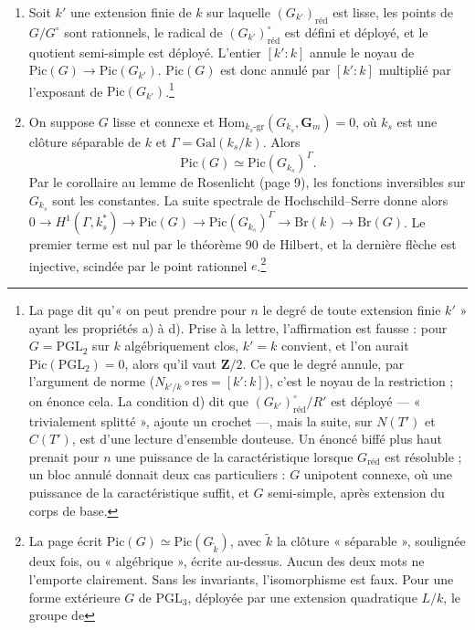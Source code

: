 \documentclass[11pt,a4paper]{article}
\begin{document}
\begin{enumerate}
\item[1°)] Soit $k'$ une extension finie de $k$ sur laquelle
$(G_{k'})_{\mathrm{réd}}$ est lisse, les points de $G/G^{\circ}$ sont
rationnels, le radical de $(G_{k'})^{\circ}_{\mathrm{réd}}$ est défini et
déployé, et le quotient semi-simple est déployé. L'entier $[k':k]$ annule le
noyau de $\mathrm{Pic}(G) \to \mathrm{Pic}(G_{k'})$. $\mathrm{Pic}(G)$ est
donc annulé par $[k':k]$ multiplié par l'exposant de
$\mathrm{Pic}(G_{k'})$.\footnote{La page dit qu'« on peut prendre pour $n$ le
degré de toute extension finie $k'$ » ayant les propriétés a) à d). Prise à la
lettre, l'affirmation est fausse : pour $G = \mathrm{PGL}_{2}$ sur $k$
algébriquement clos, $k' = k$ convient, et l'on aurait
$\mathrm{Pic}(\mathrm{PGL}_{2}) = 0$, alors qu'il vaut $\mathbf{Z}/2$. Ce
que le degré annule, par l'argument de norme
($N_{k'/k} \circ \mathrm{res} = [k':k]$), c'est le noyau de la restriction ;
on énonce cela. La condition d) dit que
$(G_{k'})^{\circ}_{\mathrm{réd}}/R'$ est déployé --- « trivialement
splitté », ajoute un crochet ---, mais la suite, sur $N(T')$ et $C(T')$, est
d'une lecture d'ensemble douteuse. Un énoncé biffé plus haut prenait pour $n$
une puissance de la caractéristique lorsque $G_{\mathrm{réd}}$ est
résoluble ; un bloc annulé donnait deux cas particuliers : $G$ unipotent
connexe, où une puissance de la caractéristique suffit, et $G$ semi-simple,
après extension du corps de base.}
\item[2°)] On suppose $G$ lisse et connexe et
$\mathrm{Hom}_{k_{s}\text{-gr}}(G_{k_{s}}, \mathbf{G}_{m}) = 0$, où $k_{s}$ est
une clôture séparable de $k$ et $\Gamma = \mathrm{Gal}(k_{s}/k)$. Alors
\[
  \mathrm{Pic}(G) \simeq \mathrm{Pic}(G_{k_{s}})^{\Gamma} .
\]
Par le corollaire au lemme de Rosenlicht (page 9), les fonctions
inversibles sur $G_{k_{s}}$ sont les constantes. La suite spectrale de
Hochschild--Serre donne alors
$0 \to H^{1}(\Gamma, k_{s}^{*}) \to \mathrm{Pic}(G) \to
\mathrm{Pic}(G_{k_{s}})^{\Gamma} \to \mathrm{Br}(k) \to \mathrm{Br}(G)$. Le
premier terme est nul par le théorème 90 de Hilbert, et la dernière flèche
est injective, scindée par le point rationnel $e$.\footnote{La page écrit
$\mathrm{Pic}(G) \simeq \mathrm{Pic}(G_{\tilde k})$, avec $\tilde k$ la
clôture « séparable », soulignée deux fois, ou « algébrique », écrite
au-dessus. Aucun des deux mots ne l'emporte clairement. Sans les invariants,
l'isomorphisme est faux. Pour une forme extérieure $G$ de
$\mathrm{PGL}_{3}$, déployée par une extension quadratique $L/k$, le groupe de
}
\end{enumerate}
\end{document}
